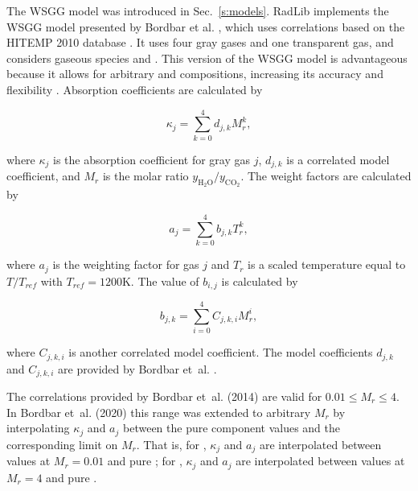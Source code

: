 \documentclass[preprint,12pt]{elsarticle}
\begin{document}
The WSGG model was introduced in Sec.~\ref{s:models}.
RadLib implements the WSGG model presented by Bordbar et al. \citep{Bordbar_2014,Bordbar_2020}, which uses correlations based on the HITEMP 2010 database \cite{Rothman_2010}. It uses four gray gases and one transparent gas, and considers gaseous species  and . This version of the WSGG model is advantageous because it allows for arbitrary  and  compositions, increasing its accuracy and flexibility \citep{Bordbar_2020}. Absorption coefficients are calculated by 
%
\begin{linenomath}
\begin{equation}
    \kappa_j=\sum_{k=0}^{4}d_{j,k}M_r^k,
\end{equation}
\end{linenomath}
%
where $\kappa_j$ is the absorption coefficient for gray gas $j$, $d_{j,k}$ is a correlated model coefficient, and $M_r$ is the molar ratio $y_{\mathrm{H_2O}}/y_{\mathrm{CO_2}}$. The weight factors are calculated by 
%
\begin{linenomath}
\begin{equation}
    a_j=\sum_{k=0}^{4}b_{j,k}T_r^k,
\end{equation}
\end{linenomath}
%
where $a_j$ is the weighting factor for gas $j$ and $T_r$ is a scaled temperature equal to $T/T_{ref}$ with $T_{ref}=1200$K. The value of $b_{i,j}$ is calculated by 
%
\begin{linenomath}
\begin{equation}
 b_{j,k}=\sum_{i=0}^{4}C_{j,k,i}M_r^i,
\end{equation}
\end{linenomath}
%
where $C_{j,k,i}$ is another correlated model coefficient. The model coefficients $d_{j,k}$ and $C_{j,k,i}$ are provided by Bordbar et~al. \citep{Bordbar_2014,Bordbar_2020}. 

The correlations provided by Bordbar et~al. (2014) \cite{Bordbar_2014} are valid for $0.01\le M_r\le4$. In Bordbar et~al. (2020) \cite{Bordbar_2020} this range was extended to arbitrary $M_r$ by interpolating $\kappa_j$ and $a_j$ between the pure component values and the corresponding limit on $M_r$. That is, for , $\kappa_j$ and $a_j$ are interpolated between values at $M_r=0.01$ and pure ; for , $\kappa_j$ and $a_j$ are interpolated between values at $M_r=4$ and pure .

\end{document}
